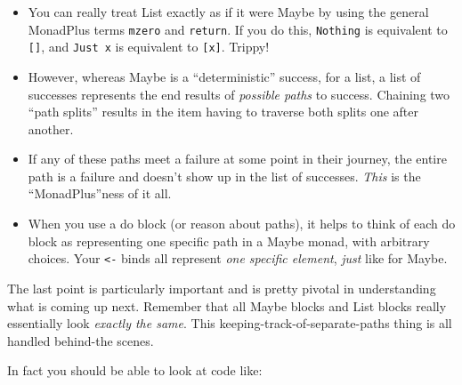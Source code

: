 \documentclass[]{article}
\newenvironment{Shaded}{}{}
\newcommand{\KeywordTok}[1]{\textcolor[rgb]{0.00,0.44,0.13}{\textbf{{#1}}}}
\newcommand{\DataTypeTok}[1]{\textcolor[rgb]{0.56,0.13,0.00}{{#1}}}
\newcommand{\DecValTok}[1]{\textcolor[rgb]{0.25,0.63,0.44}{{#1}}}
\newcommand{\CommentTok}[1]{\textcolor[rgb]{0.38,0.63,0.69}{\textit{{#1}}}}
\newcommand{\OtherTok}[1]{\textcolor[rgb]{0.00,0.44,0.13}{{#1}}}
\newcommand{\FunctionTok}[1]{\textcolor[rgb]{0.02,0.16,0.49}{{#1}}}
\newcommand{\NormalTok}[1]{{#1}}
\begin{document}
\begin{itemize}
\tightlist
\item
  You can really treat List exactly as if it were Maybe by using the
  general MonadPlus terms \texttt{mzero} and \texttt{return}. If you do
  this, \texttt{Nothing} is equivalent to \texttt{{[}{]}}, and
  \texttt{Just\ x} is equivalent to \texttt{{[}x{]}}. Trippy!
\item
  However, whereas Maybe is a ``deterministic'' success, for a list, a
  list of successes represents the end results of \emph{possible paths}
  to success. Chaining two ``path splits'' results in the item having to
  traverse both splits one after another.
\item
  If any of these paths meet a failure at some point in their journey,
  the entire path is a failure and doesn't show up in the list of
  successes. \emph{This} is the ``MonadPlus''ness of it all.
\item
  When you use a do block (or reason about paths), it helps to think of
  each do block as representing one specific path in a Maybe monad, with
  arbitrary choices. Your \texttt{\textless{}-} binds all represent
  \emph{one specific element}, \emph{just} like for Maybe.
\end{itemize}

The last point is particularly important and is pretty pivotal in
understanding what is coming up next. Remember that all Maybe blocks and
List blocks really essentially look \emph{exactly the same}. This
keeping-track-of-separate-paths thing is all handled behind-the scenes.

In fact you should be able to look at code like:

\begin{Shaded}
\end{Shaded}
\end{document}

